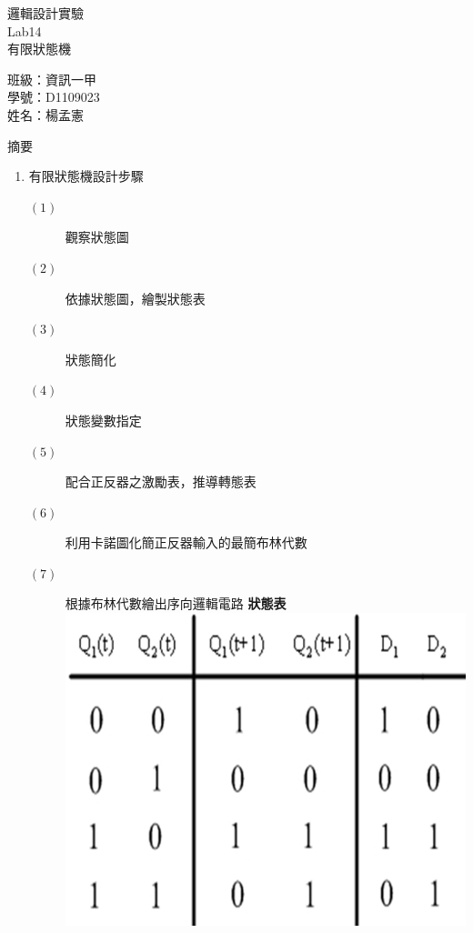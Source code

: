 \documentclass[12pt, a4paper]{article}
\begin{document}
\begin{center}
  {\Huge 邏輯設計實驗} \\[2.5cm]
  {\Huge Lab14} \\[1.5cm]
  {\Huge 有限狀態機} \\ [4.5cm]
  \hspace{.6in}
  \begin{minipage}[t]{.4\linewidth}
    {\Large 班級：資訊一甲}\\[0.5cm]
    {\Large 學號：D1109023}\\[0.5cm]
    {\Large 姓名：楊孟憲}
  \end{minipage}    
\end{center}

\newpage

\begin{description}
  \fontsize{22pt}{25pt}\selectfont 
    \item [一、]摘要 
      \begin{enumerate}
        \fontsize{20pt}{22pt}\selectfont
          \item 有限狀態機設計步驟 \\
            \begin{samepage}
              \fontsize{16pt}{20}\selectfont
              \begin{description}
                \item [$(1)$] 觀察狀態圖
                \item [$(2)$] 依據狀態圖，繪製狀態表 
                \item [$(3)$] 狀態簡化
                \item [$(4)$] 狀態變數指定
                \item [$(5)$] 配合正反器之激勵表，推導轉態表
                \item [$(6)$] 利用卡諾圖化簡正反器輸入的最簡布林代數
                \item [$(7)$] 根據布林代數繪出序向邏輯電路
                \bf 狀態表
                \includegraphics[width=13cm]{./image/designed-the-kmap.png}
              \end{description}
            \end{samepage}


\end{enumerate}
\end{description}
\end{document}
